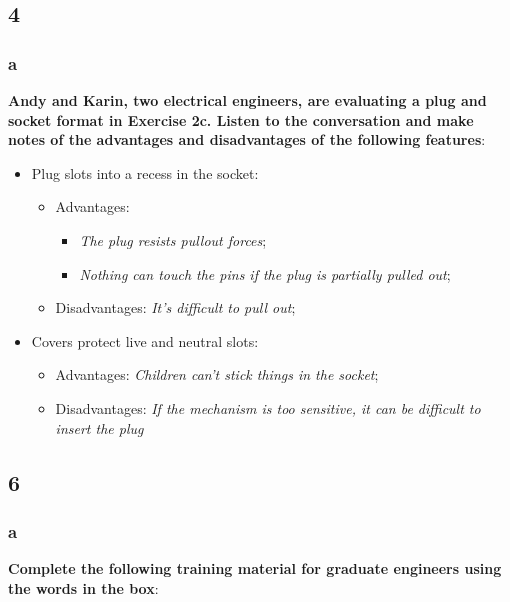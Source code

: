 \subsection{4}

\subsubsection{a}

\textbf{Andy and Karin, two electrical engineers, are evaluating a plug and socket format in Exercise 2c. Listen to the conversation and make notes of the advantages and disadvantages of the following features}:

\begin{itemize}

\item Plug slots into a recess in the socket: 
\begin{itemize}
\item Advantages:
\begin{itemize}
\item\textit{The plug resists pullout forces};
\item\textit{Nothing can touch the pins if the plug is partially pulled out};
\end{itemize}
\item Disadvantages: \textit{It's difficult to pull out};
\end{itemize}
\item Covers protect live and neutral slots:
\begin{itemize}
\item Advantages: \textit{Children can't stick things in the socket};
\item Disadvantages: \textit{If the mechanism is too sensitive, it can be difficult to insert the plug}
\end{itemize}

\end{itemize}

\subsection{6}

\subsubsection{a}

\textbf{Complete the following training material for graduate engineers using the words in the box}:

